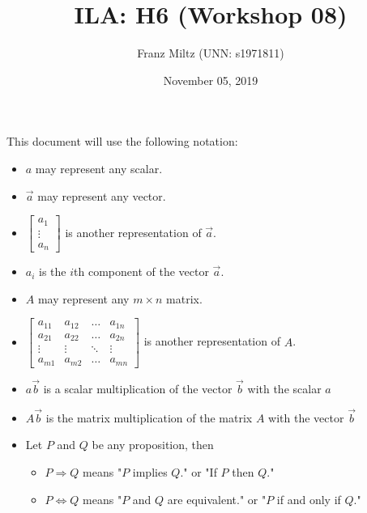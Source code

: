 \documentclass{article}
\title{ILA: H6 (Workshop 08)}
\author{Franz Miltz (UNN: s1971811)}
\date{November 05, 2019}
\begin{document}
\maketitle
This document will use the following notation:
\begin{itemize}
    \item $a$ may represent any scalar.
    \item $\vec{a}$ may represent any vector.
    \item $\begin{bmatrix}
        a_1\\
        \vdots\\
        a_n
    \end{bmatrix}$ is another representation of $\vec a$. 
    \item $a_i$ is the $i$th component of the vector $\vec a$.
    \item $A$ may represent any $m\times n$ matrix.
    \item $\begin{bmatrix}
        a_{11} & a_{12}&\dots &a_{1n}\\
        a_{21} & a_{22}&\dots &a_{2n}\\
        \vdots & \vdots & \ddots & \vdots\\
        a_{m1} & a_{m2} &\dots &a_{mn}
    \end{bmatrix}$ is another representation of $A$.
    \item $a\vec{b}$ is a scalar multiplication of the vector $\vec{b}$ with the scalar $a$
    \item $A\vec b$ is the matrix multiplication of the matrix $A$ with the vector $\vec b$
    \item Let $P$ and $Q$ be any proposition, then
    \begin{itemize}
        \item $P\Rightarrow Q$ means "$P$ implies $Q$." or "If $P$ then $Q$."
        \item $P\Leftrightarrow Q$ means "$P$ and $Q$ are equivalent." or "$P$ if and only if $Q$."
    \end{itemize}
\end{itemize}
\end{document}
